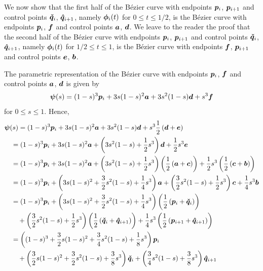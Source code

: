 \begin{rmk}
We now show that the first half of the Bézier curve with endpoints
$\bm{p}_i$, $\bm{p}_{i+1}$ and control points $\bm{\check{q}}_i$,
$\bm{\hat{q}}_{i+1}$, namely $\bm{\phi}_i(t)$ for
$0\leq t \leq 1/2$, is the Bézier curve with endpoints
$\bm{p}_i$, $\bm{f}$ and control points $\bm{a}$, $\bm{d}$.
We leave to the reader the proof that the second half of the Bézier
curve with endpoints $\bm{p}_i$, $\bm{p}_{i+1}$ and control points
$\bm{\check{q}}_i$, $\bm{\hat{q}}_{i+1}$, namely $\bm{\phi}_i(t)$
for $1/2 \leq t \leq 1$, is the Bézier curve with endpoints
$\bm{f}$, $\bm{p}_{i+1}$ and control points $\bm{e}$, $\bm{b}$.

The parametric representation of the Bézier curve with endpoints
$\bm{p}_i$, $\bm{f}$ and control points $\bm{a}$, $\bm{d}$ is
given by
\[
\bm{\psi}(s) = (1-s)^3 \bm{p}_i +3s(1-s)^2 \bm{a} +
3s^2(1-s)\bm{d} +s^3 \bm{f}
\]
for $0 \leq s \leq 1$.  Hence,
\begin{align*}
&\VEC{\psi}(s) =
(1-s)^3 \VEC{p}_i +3s(1-s)^2 \VEC{a} + 3s^2(1-s)\VEC{d} +
s^3 \frac{1}{2}\left(\VEC{d}+\VEC{e}\right) \\
&\quad = (1-s)^3 \VEC{p}_i +3s(1-s)^2 \VEC{a} +
\left( 3s^2(1-s) + \frac{1}{2} s^3\right) \VEC{d}
+ \frac{1}{2} s^3 \VEC{e} \\
&\quad = (1-s)^3 \VEC{p}_i +3s(1-s)^2 \VEC{a} +
\left( 3s^2(1-s) + \frac{1}{2} s^3\right) \left(
\frac{1}{2}\left(\VEC{a}+\VEC{c}\right)\right)
+ \frac{1}{2} s^3 \left( \frac{1}{2}\left(\VEC{c}+\VEC{b}\right)\right) \\
&\quad = (1-s)^3 \VEC{p}_i +
\left(3s(1-s)^2 + \frac{3}{2}s^2(1-s) + \frac{1}{4} s^3\right) \VEC{a}
+ \left( \frac{3}{2}s^2(1-s) + \frac{1}{2} s^3 \right) \VEC{c}
+ \frac{1}{4} s^3 \VEC{b} \\
&\quad = (1-s)^3 \VEC{p}_i +
\left(3s(1-s)^2 + \frac{3}{2} s^2(1-s) + \frac{1}{4} s^3\right)
\left( \frac{1}{2}\left(\VEC{p}_i+\VEC{\check{q}}_i\right) \right) \\
&\qquad + \left( \frac{3}{2} s^2(1-s) + \frac{1}{2} s^3 \right)
\left( \frac{1}{2}\left(\VEC{\check{q}}_i+\VEC{\hat{q}}_{i+1}\right)\right)
+ \frac{1}{4} s^3 \left(
\frac{1}{2}\left(\VEC{p}_{i+1}+\VEC{\hat{q}}_{i+1}\right) \right) \\
&\quad = \left( (1-s)^3 + \frac{3}{2}s(1-s)^2 + \frac{3}{4} s^2(1-s)
+ \frac{1}{8} s^3 \right) \VEC{p}_i \\
&\qquad + \left(\frac{3}{2} s(1-s)^2 +
\frac{3}{2} s^2(1-s) + \frac{3}{8} s^3\right) \VEC{\check{q}}_i
+ \left( \frac{3}{4} s^2(1-s) + \frac{3}{8} s^3 \right) \VEC{\hat{q}}_{i+1}

\end{align*}
\end{rmk}
